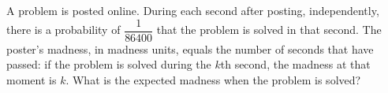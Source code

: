 A problem is posted online. During each second after posting, independently, there is a probability of $\dfrac1{86400}$ that the problem is solved in that second. The poster's madness, in madness units, equals the number of seconds that have passed: if the problem is solved during the $k$th second, the madness at that moment is $k$. What is the expected madness when the problem is solved?
